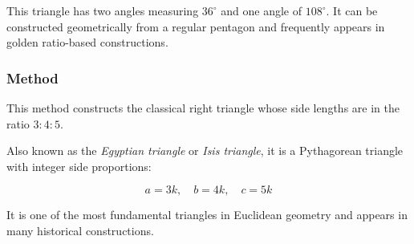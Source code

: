 \noindent
This triangle has two angles measuring $36^\circ$ and one angle of $108^\circ$. It can be constructed geometrically from a regular pentagon and frequently appears in golden ratio-based constructions.

\vspace{1em}

\begin{minipage}{.5\textwidth}
\begin{center}
\end{center}
\end{minipage}
\begin{minipage}{.5\textwidth}
\begin{tkzexample}
\end{tkzexample}
\end{minipage}

\subsubsection{Method }
\label{ssub:_line_egyptian}

This method constructs the classical right triangle whose side lengths are in the ratio $3\mathbin{:}4\mathbin{:}5$.

\medskip
\noindent
Also known as the \emph{Egyptian triangle} or \emph{Isis triangle}, it is a Pythagorean triangle with integer side proportions:

\[
a = 3k,\quad b = 4k,\quad c = 5k
\]

\noindent
It is one of the most fundamental triangles in Euclidean geometry and appears in many historical constructions.

\vspace{1em}

